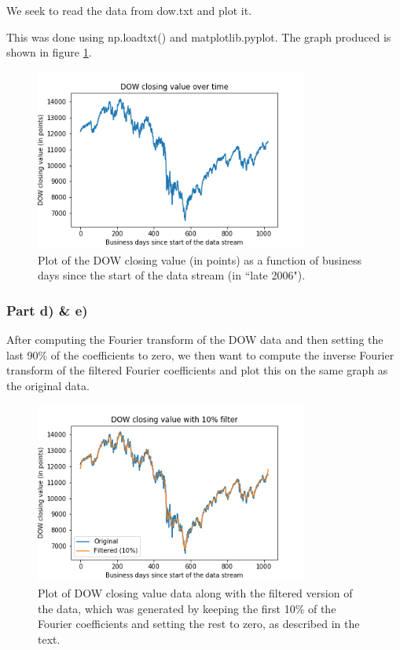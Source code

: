 \documentclass{article}
\begin{document}
We seek to read the data from dow.txt and plot it.

This was done using np.loadtxt() and matplotlib.pyplot. The graph produced is shown in figure \ref{fig:1b_dow}.

\begin{figure}[H]
	\centering
	\includegraphics[width=0.8\textwidth]{../images/1b_dow.png}
	\caption{Plot of the DOW closing value (in points) as a function of business days since the start of the data stream (in ``late 2006").}
	\label{fig:1b_dow}
\end{figure}

\subsubsection{Part d) \& e)}

After computing the Fourier transform of the DOW data and then setting the last 90\% of the coefficients to zero, we then want to compute the inverse Fourier transform of the filtered Fourier coefficients and plot this on the same graph as the original data.

\begin{figure}[H]
	\centering
	\includegraphics[width=0.8\textwidth]{../images/1b_filtered_10.png}
	\caption{Plot of DOW closing value data along with the filtered version of the data, which was generated by keeping the first 10\% of the Fourier coefficients and setting the rest to zero, as described in the text.}
	\label{fig:1b_filtered_10}
\end{figure}
\end{document}
